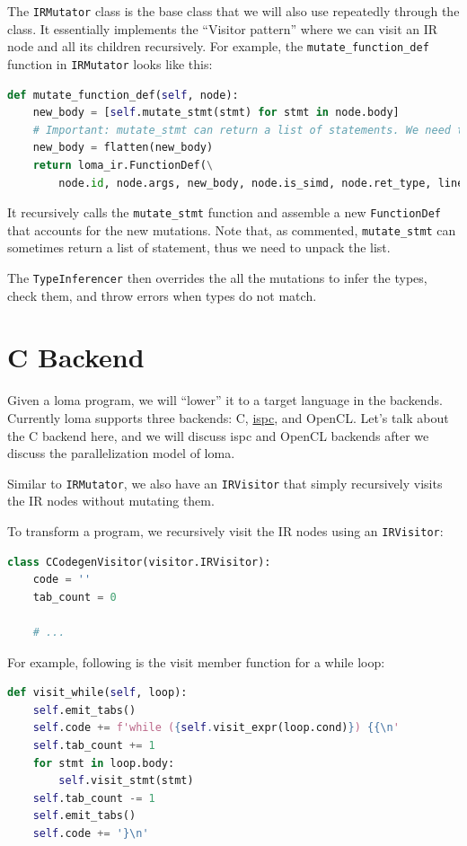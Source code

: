 The \lstinline{IRMutator} class is the base class that we will also use repeatedly through the class. It essentially implements the ``Visitor pattern'' where we can visit an IR node and all its children recursively. For example, the \lstinline{mutate_function_def} function in \lstinline{IRMutator} looks like this:
\begin{lstlisting}[language=Python]
def mutate_function_def(self, node):
    new_body = [self.mutate_stmt(stmt) for stmt in node.body]
    # Important: mutate_stmt can return a list of statements. We need to flatten the list.
    new_body = flatten(new_body)
    return loma_ir.FunctionDef(\
        node.id, node.args, new_body, node.is_simd, node.ret_type, lineno = node.lineno)
\end{lstlisting}
It recursively calls the \lstinline{mutate_stmt} function and assemble a new \lstinline{FunctionDef} that accounts for the new mutations. Note that, as commented, \lstinline{mutate_stmt} can sometimes return a list of statement, thus we need to unpack the list.

The \lstinline{TypeInferencer} then overrides the all the mutations to infer the types, check them, and throw errors when types do not match.

\section{C Backend}

Given a loma program, we will ``lower'' it to a target language in the backends. Currently loma supports three backends: C, \href{https://ispc.github.io/index.html}{ispc}, and OpenCL. Let's talk about the C backend here, and we will discuss ispc and OpenCL backends after we discuss the parallelization model of loma.

Similar to \lstinline{IRMutator}, we also have an \lstinline{IRVisitor} that simply recursively visits the IR nodes without mutating them.

To transform a program, we recursively visit the IR nodes using an \lstinline{IRVisitor}:
\begin{lstlisting}[language=python]
class CCodegenVisitor(visitor.IRVisitor):
    code = ''
    tab_count = 0

    # ...
\end{lstlisting}

For example, following is the visit member function for a while loop:
\begin{lstlisting}[language=python]
def visit_while(self, loop):
    self.emit_tabs()
    self.code += f'while ({self.visit_expr(loop.cond)}) {{\n'
    self.tab_count += 1
    for stmt in loop.body:
        self.visit_stmt(stmt)
    self.tab_count -= 1
    self.emit_tabs()
    self.code += '}\n'
\end{lstlisting}

